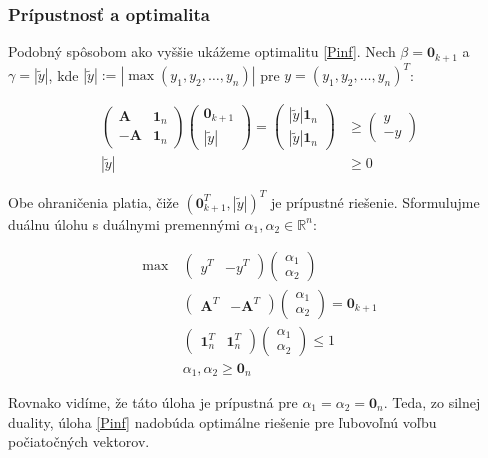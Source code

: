 \documentclass[report.tex]{subfiles}
\begin{document}
\subsubsection{Prípustnosť a optimalita}

Podobný spôsobom ako vyššie ukážeme optimalitu \eqref{Pinf}. Nech $\beta = \mathbf{0}_{k+1}$ a $\gamma = |\tilde{y}|$, kde $|\tilde{y}| := |\max(y_1, y_2, \dots, y_n)|$ pre $y = (y_1, y_2, \dots, y_n)^T$:

\begin{align*}
	\left(
	\begin{array}{c|c}
		\mathbf{A} & \mathbf{1}_n \\
		\hline
		-\mathbf{A} & \mathbf{1}_n
	\end{array}
	\right)
	\left(
	\begin{array}{c}
		\mathbf{0}_{k+1} \\
		\hline
		|\tilde{y}|
	\end{array}
	\right)
	=
	\left(
		\begin{array}{c}
			|\tilde{y}| \mathbf{1}_n \\
			\hline
			|\tilde{y}| \mathbf{1}_n
		\end{array}
	\right)
	&\geq
	\left(
		\begin{array}{c}
			y \\
			\hline
			-y
		\end{array}
	\right) \\
	|\tilde{y}| &\geq 0 
\end{align*}

Obe ohraničenia platia, čiže $(\mathbf{0}_{k+1}^T, |\tilde{y}|)^T$ je prípustné riešenie. Sformulujme duálnu úlohu s duálnymi premennými $\alpha_1, \alpha_2 \in \mathbb{R}^n$:

\begin{align*}
	\text{max}~ &
	\left(
		\begin{array}{c|c}
			y^T & -y^T
		\end{array}
	\right)
	\left(
		\begin{array}{c}
			\alpha_1 \\
			\hline
			\alpha_2
		\end{array}
	\right) \\
	&\left(
		\begin{array}{c|c}
			\mathbf{A}^T & -\mathbf{A}^T
		\end{array}
	\right)
	\left(
		\begin{array}{c}
			\alpha_1 \\
			\hline
			\alpha_2
		\end{array}
	\right)
	=
	\mathbf{0}_{k+1} \\
	&\left(
		\begin{array}{c|c}
			\mathbf{1}_n^T & \mathbf{1}_n^T
		\end{array}
	\right)
	\left(
		\begin{array}{c}
			\alpha_1 \\
			\hline
			\alpha_2
		\end{array}
	\right)
	\leq
	1 \\
	&\alpha_1, \alpha_2 \geq \mathbf{0}_{n} 
\end{align*}

Rovnako vidíme, že táto úloha je prípustná pre $\alpha_1 = \alpha_2 = \mathbf{0}_n$. Teda, zo silnej duality, úloha \eqref{Pinf} nadobúda optimálne riešenie pre ľubovoľnú voľbu počiatočných vektorov.
\end{document}
